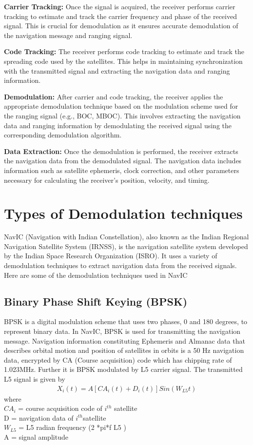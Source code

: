 \documentclass[10pt, onecolumn]{article}
\begin{document}
\begin{enumerate}
\textbf{Carrier Tracking:} Once the signal is acquired, the receiver performs carrier tracking to estimate and track the carrier frequency and phase of the received signal. This is crucial for demodulation as it ensures accurate demodulation of the navigation message and ranging signal.

\textbf{Code Tracking:} The receiver performs code tracking to estimate and track the spreading code used by the satellites. This helps in maintaining synchronization with the transmitted signal and extracting the navigation data and ranging information.

\textbf{Demodulation:} After carrier and code tracking, the receiver applies the appropriate demodulation technique based on the modulation scheme used for the ranging signal (e.g., BOC, MBOC). This involves extracting the navigation data and ranging information by demodulating the received signal using the corresponding demodulation algorithm.

\textbf{Data Extraction:} Once the demodulation is performed, the receiver extracts the navigation data from the demodulated signal. The navigation data includes information such as satellite ephemeris, clock correction, and other parameters necessary for calculating the receiver's position, velocity, and timing.




\section{Types of Demodulation techniques}
NavIC (Navigation with Indian Constellation), also known as the Indian Regional Navigation Satellite System (IRNSS), is the navigation satellite system developed by the Indian Space Research Organization (ISRO). It uses a variety of demodulation techniques to extract navigation data from the received signals. 
Here are some of the demodulation techniques used in NavIC
\subsection{Binary Phase Shift Keying (BPSK)}
BPSK is a digital modulation scheme that uses two phases, 0 and 180 degrees, to represent binary data. In NavIC, BPSK is used for transmitting the navigation message.
Navigation information constituting Ephemeris and Almanac
data that describes orbital motion and position of satellites in
orbits is a 50 Hz navigation data, encrypted by CA (Course
acquisition) code which has chipping rate of 1.023MHz.
Further it is BPSK modulated by L5 carrier signal. The
transmitted L5 signal is given by 
\begin{align}
X_i(t)= A[ CA_i(t) + D_i(t)]Sin( W_{L5} t )
\end{align}
where \\
$CA_i$   = course acquisition code of $i^{th}$ satellite\\
D        = navigation data of $i^{th}$satellite\\
$W_{L5}$ = L5 radian frequency (2 *pi*f L5 )\\
A        = signal amplitude\\


\end{enumerate}
\end{document}
